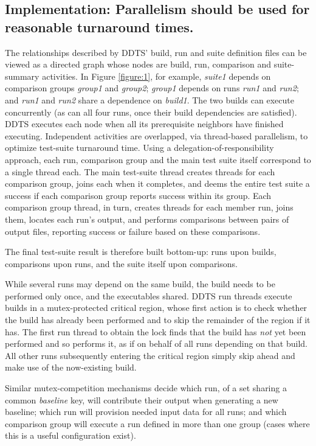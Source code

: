 \documentclass[conference]{IEEEtran}
\begin{document}
\subsection{Implementation: Parallelism should be used for reasonable turnaround times.}

The relationships described by DDTS' build, run and suite definition files can be viewed as a directed graph whose nodes are build, run, comparison and suite-summary activities. In Figure \ref{figure:1}, for example, \emph{suite1} depends on comparison groups \emph{group1} and \emph{group2}; \emph{group1} depends on runs \emph{run1} and \emph{run2}; and \emph{run1} and \emph{run2} share a dependence on \emph{build1}. The two builds can execute concurrently (as can all four runs, once their build dependencies are satisfied). DDTS executes each node when all its prerequisite neighbors have finished executing. Independent activities are overlapped, via thread-based parallelism, to optimize test-suite turnaround time. Using a delegation-of-responsibility approach, each run, comparison group and the main test suite itself correspond to a single thread each. The main test-suite thread creates threads for each comparison group, joins each when it completes, and deems the entire test suite a success if each comparison group reports success within its group. Each comparison group thread, in turn, creates threads for each member run, joins them, locates each run's output, and performs comparisons between pairs of output files, reporting success or failure based on these comparisons.

The final test-suite result is therefore built bottom-up: runs upon builds, comparisons upon runs, and the suite itself upon comparisons.

While several runs may depend on the same build, the build needs to be performed only once, and the executables shared. DDTS run threads execute builds in a mutex-protected critical region, whose first action is to check whether the build has already been performed and to skip the remainder of the region if it has. The first run thread to obtain the lock finds that the build has \emph{not} yet been performed and so performs it, as if on behalf of all runs depending on that build. All other runs subsequently entering the critical region simply skip ahead and make use of the now-existing build.

Similar mutex-competition mechanisms decide which run, of a set sharing a common \emph{baseline} key, will contribute their output when generating a new baseline; which run will provision needed input data for all runs; and which comparison group will execute a run defined in more than one group (cases where this is a useful configuration exist).
\end{document}
